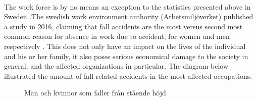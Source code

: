 \documentclass[12pt, a4paper, onecolumn]{article}
\begin{document}
\paragraph{}The work force is by no means an exception to the statistics presented above in Sweden .The swedish work environment authority (Arbetsmiljöverket) published a study in 2016, claiming that fall accidents are the most versus second most common reason for absence in work due to accident, for women and men respectively \cite[p~1]{av}. This does not only have an impact on the lives of the individual and his or her family, it also poses serious economical damage to the society in general, and the affected organizations in particular. The diagram below illustrated the amount of fall related accidents in the most affected occupations. 


\begin{figure}[h]
	\centering
	\qquad
	\caption{Män och kvinnor som faller från stående höjd}%
	\label{fig:example}%
\end{figure}
\end{document}
